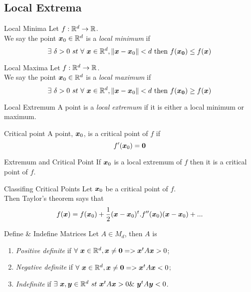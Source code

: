 \documentclass[11pt,a4paper]{article}
\begin{document}
\subsection{Local Extrema}

\subtitle{Definition 15.03 - }{Local Minima}
Let $f : \mathbb{R}^d \to \mathbb{R}$.\\
We say the point $\boldsymbol{x}_0 \in \mathbb{R}^d$ is a \textit{local minimum} if
$$\exists\ \delta > 0\ st\ \forall\ \boldsymbol{x} \in \mathbb{R}^d, \|\boldsymbol{x} - \boldsymbol{x}_0\| < d \mathrm{\ then\ } f(\boldsymbol{x_0}) \leq f(\boldsymbol{x})$$

\subtitle{Definition 15.04 - }{Local Maxima}
Let $f : \mathbb{R}^d \to \mathbb{R}$.\\
We say the point $\boldsymbol{x}_0 \in \mathbb{R}^d$ is a \textit{local maximum} if
$$\exists\ \delta > 0\ st\ \forall\ \boldsymbol{x} \in \mathbb{R}^d, \|\boldsymbol{x} - \boldsymbol{x}_0\| < d \mathrm{\ then\ } f(\boldsymbol{x_0}) \geq f(\boldsymbol{x})$$

\subtitle{Definition 15.05 - }{Local Extremum}
A point is a \textit{local extremum} if it is either a local minimum or maximum.\\

\subtitle{Definition 15.06 - }{Critical point}
A point, $\boldsymbol{x}_0$, is a critical point of $f$ if $$f'(\boldsymbol{x}_0) = \boldsymbol{0}$$

\subtitle{Proposition 15.07 - }{Extremum and Critical Point}
If $\boldsymbol{x}_0$ is a local extremum of $f$ then it is a critical point of $f$.\\

\subtitle{Remark 15.08 - }{Classifing Critical Points}
Let $\boldsymbol{x}_0$ be a critical point of $f$.\\
Then Taylor's theorem says that
$$f(\boldsymbol{x}) = f(\boldsymbol{x}_0) + \frac{1}{2}(\boldsymbol{x} - \boldsymbol{x}_0)^t.f''(\boldsymbol{x}_0)(\boldsymbol{x} - \boldsymbol{x}_0) + ...$$

\subtitle{Definition 15.09 - }{Define \& Indefine Matrices}
Let $A \in M_d$, then $A$ is
\begin{enumerate}[label=\roman*)]
  \item \textit{Positive definite} if $\forall\ \vect{x} \in \real^d, \vect{x} \not = \vect{0} => \vect{x}^tA\vect{x} > 0$;
  \item \textit{Negative definite} if $\forall\ \vect{x} \in \real^d, \vect{x} \not = \vect{0} => \vect{x}^tA\vect{x} < 0$;
  \item \textit{Indefinite} if $\exists\ \vect{x}, \vect{y} \in \real^d\ st\ \vect{x}^tA\vect{x} > 0 \&\ \vect{y}^tA\vect{y} < 0$.
\end{enumerate}
\end{document}
